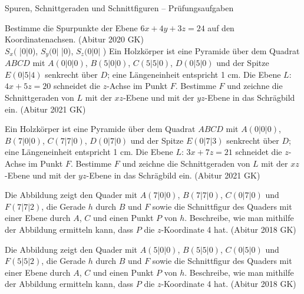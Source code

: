 \begin{aufgabe}{Spuren, Schnittgeraden und Schnittfiguren – Prüfungsaufgaben}
\begin{teile}
\teil Bestimme die Spurpunkte der Ebene $6x + 4y + 3z = 24$ auf den Koordinatenachsen. \hfill (Abitur 2020 GK) \\ $S_x($ \leerfeld |0|0), $S_y(0|$ \leerfeld |0), $S_z(0|0|$ \leerfeld )
\teil Ein Holzkörper ist eine Pyramide über dem Quadrat $ABCD$ mit $A(0|0|0)$, $B(5|0|0)$, $C(5|5|0)$, $D(0|5|0)$ und der Spitze $E(0|5|4)$ senkrecht über $D$; eine Längeneinheit entspricht 1 cm. Die Ebene $L$: $4x + 5z = 20$ schneidet die $z$-Achse im Punkt $F$. Bestimme $F$ und zeichne die Schnittgeraden von $L$ mit der $xz$-Ebene und mit der $yz$-Ebene in das Schrägbild ein. \hfill (Abitur 2021 GK)

\begin{ksys3}[xyz,x1min=0,x1max=6,x2min=0,x2max=6,x3min=0,x3max=5]  \end{ksys3}
\teil Ein Holzkörper ist eine Pyramide über dem Quadrat $ABCD$ mit $A(0|0|0)$, $B(7|0|0)$, $C(7|7|0)$, $D(0|7|0)$ und der Spitze $E(0|7|3)$ senkrecht über $D$; eine Längeneinheit entspricht 1 cm. Die Ebene $L$: $3x + 7z = 21$ schneidet die $z$-Achse im Punkt $F$. Bestimme $F$ und zeichne die Schnittgeraden von $L$ mit der $xz$-Ebene und mit der $yz$-Ebene in das Schrägbild ein. \hfill (Abitur 2021 GK)

\begin{ksys3}[xyz,x1min=0,x1max=8,x2min=0,x2max=8,x3min=0,x3max=4]  \end{ksys3}
\teil Die Abbildung zeigt den Quader mit $A(7|0|0)$, $B(7|7|0)$, $C(0|7|0)$ und $F(7|7|2)$, die Gerade $h$ durch $B$ und $F$ sowie die Schnittfigur des Quaders mit einer Ebene durch $A$, $C$ und einen Punkt $P$ von $h$. Beschreibe, wie man mithilfe der Abbildung ermitteln kann, dass $P$ die $z$-Koordinate 4 hat. \hfill (Abitur 2018 GK)

\begin{ksys3}[xyz,x1min=0,x1max=8,x2min=0,x2max=8,x3min=0,x3max=5]       \end{ksys3}
\teil Die Abbildung zeigt den Quader mit $A(5|0|0)$, $B(5|5|0)$, $C(0|5|0)$ und $F(5|5|2)$, die Gerade $h$ durch $B$ und $F$ sowie die Schnittfigur des Quaders mit einer Ebene durch $A$, $C$ und einen Punkt $P$ von $h$. Beschreibe, wie man mithilfe der Abbildung ermitteln kann, dass $P$ die $z$-Koordinate 4 hat. \hfill (Abitur 2018 GK)

\begin{ksys3}[xyz,x1min=0,x1max=6,x2min=0,x2max=6,x3min=0,x3max=5]       \end{ksys3}
\end{teile}
\end{aufgabe}

